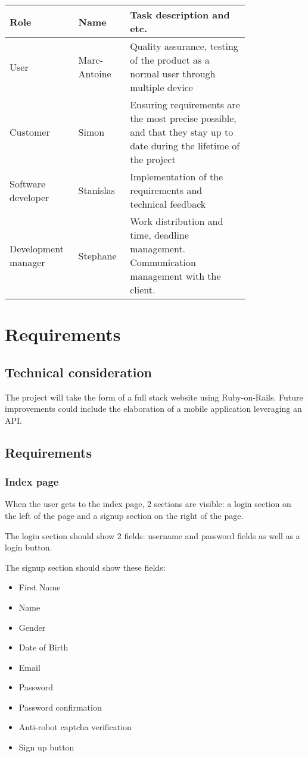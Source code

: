 \documentclass[conference]{IEEEtran}
\begin{document}
\begin{tabular}{ |p{0.2\linewidth}|p{0.15\linewidth}|p{0.45\linewidth}| }
\hline
Role & Name & Task description and etc. \\
\hline
User & Marc-Antoine & Quality assurance, testing of the product as a normal user through multiple device \\
\hline
Customer & Simon & Ensuring requirements are the most precise possible, and that they stay up to date during the lifetime of the project \\
\hline
Software developer & Stanislas & Implementation of the requirements and technical feedback \\
\hline
Development manager & Stephane & Work distribution and time, deadline management. Communication management with the client. \\
\hline
\end{tabular}

\section{Requirements}

\subsection{Technical consideration}

The project will take the form of a full stack website using Ruby-on-Rails. Future improvements could include the elaboration of a mobile application leveraging an API.

\subsection{Requirements}

\subsubsection{Index page}

When the user gets to the index page, 2 sections are visible: a login section on the left of the page and a signup section on the right of the page.

The login section should show 2 fields: username and password fields as well as a login button.

The signup section should show these fields:

\begin{itemize}
    \item First Name
    \item Name
    \item Gender
    \item Date of Birth
    \item Email
    \item Password
    \item Password confirmation
    \item Anti-robot captcha verification
    \item Sign up button
\end{itemize}
\end{document}
